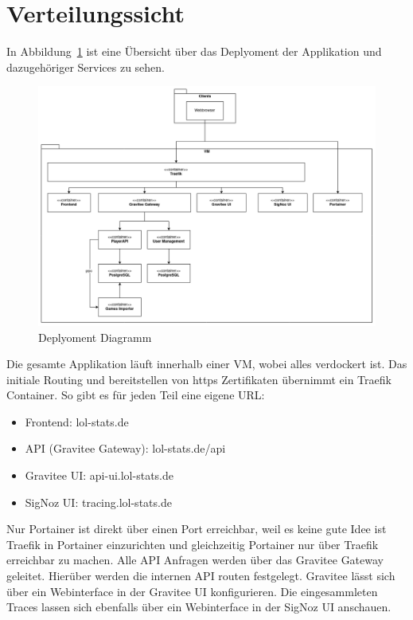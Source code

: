 \section{Verteilungssicht}

In Abbildung~\ref{fig:deployment-diagram} ist eine Übersicht über das Deplyoment der Applikation und dazugehöriger
Services zu sehen.
\begin{figure}
    \centering
    \includegraphics[width=\textwidth]{images/cdc-08-deployment-diagram.drawio}
    \caption{Deplyoment Diagramm}
    \label{fig:deployment-diagram}
\end{figure}

Die gesamte Applikation läuft innerhalb einer VM, wobei alles verdockert ist.
Das initiale Routing und bereitstellen von https Zertifikaten übernimmt ein Traefik Container.
So gibt es für jeden Teil eine eigene URL:
\begin{itemize}
    \item Frontend: lol-stats.de
    \item API (Gravitee Gateway): lol-stats.de/api
    \item Gravitee UI: api-ui.lol-stats.de
    \item SigNoz UI: tracing.lol-stats.de
\end{itemize}

Nur Portainer ist direkt über einen Port erreichbar, weil es keine gute Idee ist Traefik in Portainer einzurichten
und gleichzeitig Portainer nur über Traefik erreichbar zu machen.
Alle API Anfragen werden über das Gravitee Gateway geleitet.
Hierüber werden die internen API routen festgelegt.
Gravitee lässt sich über ein Webinterface in der Gravitee UI konfigurieren.
Die eingesammleten Traces lassen sich ebenfalls über ein Webinterface in der SigNoz UI anschauen.